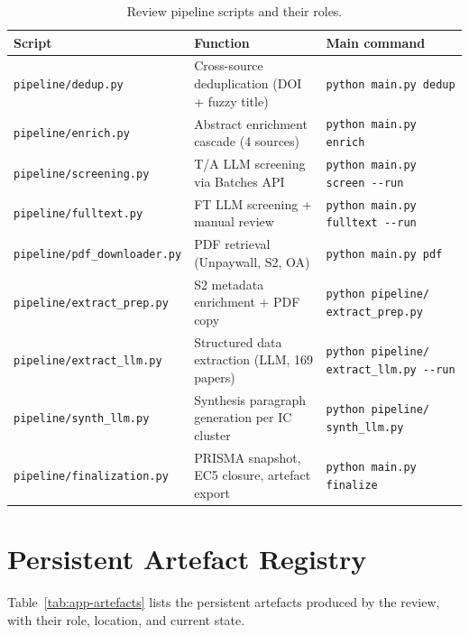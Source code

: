 \begin{table}[htbp]
\centering
\caption{Review pipeline scripts and their roles.}
\label{tab:app-pipeline}
\small
\setlength{\tabcolsep}{3pt}
\begin{tabular}{p{4.2cm} p{4.5cm} p{4.0cm}}
\toprule
\textbf{Script} & \textbf{Function} & \textbf{Main command} \\
\midrule
\texttt{pipeline/dedup.py} &
  Cross-source deduplication (DOI + fuzzy title) &
  \texttt{python main.py dedup} \\[2pt]
\texttt{pipeline/enrich.py} &
  Abstract enrichment cascade (4 sources) &
  \texttt{python main.py enrich} \\[2pt]
\texttt{pipeline/screening.py} &
  T/A LLM screening via Batches API &
  \texttt{python main.py screen -{}-run} \\[2pt]
\texttt{pipeline/fulltext.py} &
  FT LLM screening + manual review &
  \texttt{python main.py fulltext -{}-run} \\[2pt]
\texttt{pipeline/pdf\_downloader.py} &
  PDF retrieval (Unpaywall, S2, OA) &
  \texttt{python main.py pdf} \\[2pt]
\texttt{pipeline/extract\_prep.py} &
  S2 metadata enrichment + PDF copy &
  \texttt{python pipeline/} \texttt{extract\_prep.py} \\[2pt]
\texttt{pipeline/extract\_llm.py} &
  Structured data extraction (LLM, 169 papers) &
  \texttt{python pipeline/} \texttt{extract\_llm.py -{}-run} \\[2pt]
\texttt{pipeline/synth\_llm.py} &
  Synthesis paragraph generation per IC cluster &
  \texttt{python pipeline/} \texttt{synth\_llm.py} \\[2pt]
\texttt{pipeline/finalization.py} &
  PRISMA snapshot, EC5 closure, artefact export &
  \texttt{python main.py finalize} \\
\bottomrule
\end{tabular}
\end{table}

\section{Persistent Artefact Registry}
\label{app:slr-artefacts}

Table~\ref{tab:app-artefacts} lists the persistent artefacts produced by the
review, with their role, location, and current state.

